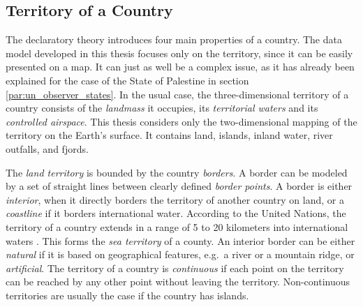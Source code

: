 
\subsection{Territory of a Country} %
\label{sub:territory_of_a_country}

The declaratory theory introduces four main properties of a country. The data model developed in this thesis focuses only on the territory, since it can be easily presented on a map. It can just as well be a complex issue, as it has already been explained for the case of the State of Palestine in section \ref{par:un_observer_states}. In the usual case, the three-dimensional territory of a country consists of the \emph{landmass} it occupies, its \emph{territorial waters} and its \emph{controlled airspace}. This thesis considers only the two-dimensional mapping of the territory on the Earth's surface. It contains land, islands, inland water, river outfalls, and fjords.

The \emph{land territory} is bounded by the country \emph{borders}. A border can be modeled by a set of straight lines between clearly defined \emph{border points}.
A border is either \emph{interior}, when it directly borders the territory of another country on land, or a \emph{coastline} if it borders international water. According to the United Nations, the territory of a country extends in a range of 5 to 20 kilometers into international waters \cite{UNSeaBorders}. This forms the \emph{sea territory} of a county.
An interior border can be either \emph{natural} if it is based on geographical features, e.g.\ a river or a mountain ridge, or \emph{artificial}.
The territory of a country is \emph{continuous} if each point on the territory can be reached by any other point without leaving the territory. Non-continuous territories are usually the case if the country has islands.

